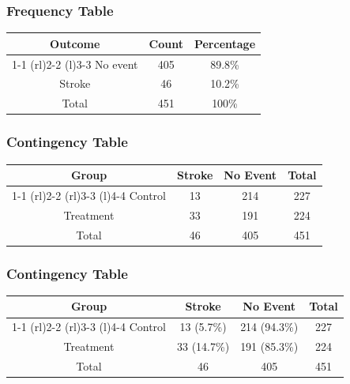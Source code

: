 \documentclass{beamer}
\begin{document}
\begin{frame}
  \frametitle{Frequency Table}
  \begin{table}
    \begin{tabular}{@{}ccc@{}}
      \toprule
      Outcome & Count & Percentage\\
      \cmidrule(r){1-1} \cmidrule(rl){2-2} \cmidrule(l){3-3}
      No event & 405 & 89.8\%\\[0.3em]
      Stroke & 46 & 10.2\% \\[0.3em]
      Total  & 451 & 100\% \\
      \bottomrule
    \end{tabular}
  \end{table}
\end{frame}

\begin{frame}
  \frametitle{Contingency Table}
  \begin{table}
    \begin{tabular}{@{}cccc@{}}
      \toprule
      Group & Stroke & No Event & Total \\
      \cmidrule(r){1-1} \cmidrule(rl){2-2} \cmidrule(rl){3-3}
      \cmidrule(l){4-4}
      Control & 13 & 214& 227 \\[0.3em]
      Treatment & 33 & 191 & 224 \\[0.3em]
      Total & 46 & 405 & 451 \\
      \bottomrule
    \end{tabular}
  \end{table}
\end{frame}

\begin{frame}
  \frametitle{Contingency Table}
  \begin{table}
    \begin{tabular}{@{}cccc@{}}
      \toprule
      Group & Stroke & No Event & Total \\
      \cmidrule(r){1-1} \cmidrule(rl){2-2} \cmidrule(rl){3-3}
      \cmidrule(l){4-4}
      Control & 13 (5.7\%) & 214 (94.3\%) & 227 \\[0.3em]
      Treatment & 33 (14.7\%) & 191 (85.3\%) & 224 \\[0.3em]
      Total & 46 & 405 & 451 \\
      \bottomrule
    \end{tabular}
  \end{table}
\end{frame}
\end{document}
